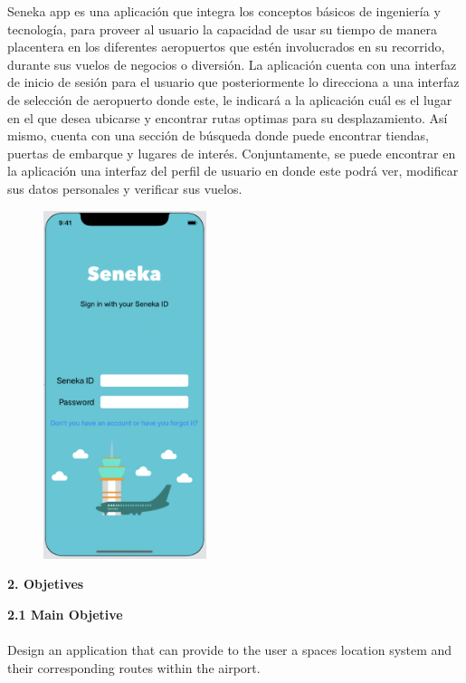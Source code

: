 \documentclass[]{article}
\begin{document}
Seneka app es una aplicación que integra los conceptos básicos de ingeniería y tecnología, para proveer al usuario la capacidad de usar su tiempo de manera placentera en los diferentes aeropuertos que estén involucrados en su recorrido, durante sus vuelos de negocios o diversión. La aplicación cuenta con una interfaz de inicio de sesión para el usuario que posteriormente lo direcciona a una interfaz de selección de aeropuerto donde este, le indicará a la aplicación cuál es el lugar en el que desea ubicarse y encontrar rutas optimas para su desplazamiento. Así mismo, cuenta con una sección de búsqueda donde puede encontrar tiendas, puertas de embarque y lugares de interés. Conjuntamente, se puede encontrar en la aplicación una interfaz del perfil de usuario en donde este podrá ver, modificar sus datos personales y verificar sus vuelos.

\begin{figure}[H]
\centering
\includegraphics[height=4.0in]{Figura_1.jpg}
\end{figure}

\Large{
\textbf{2. Objetives}\\
}

\Large{
\textbf{2.1 Main Objetive}\\
}\\
[0.1cm]
Design an application that can provide to the user a spaces location system and their corresponding routes within the airport.\\

\end{document}
